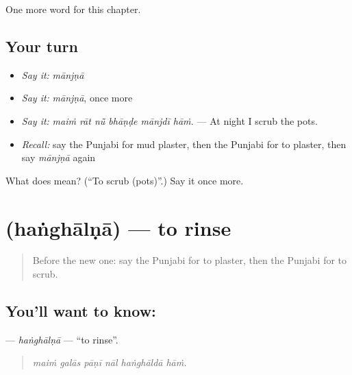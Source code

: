 \begin{grammarlens}[title={What you've built}]
One more word for this chapter.
\end{grammarlens}

\subsection*{Your turn}
\begin{itemize}
\raggedright
  \item \emph{Say it:} \emph{mānjṇā}
  \item \emph{Say it:} \emph{mānjṇā}, once more
  \item \emph{Say it:} \emph{maiṁ rāt nū̃ bhāṇḍe mānjdī hāṁ.} — At night I scrub the pots.
  \item \emph{Recall:} say the Punjabi for mud plaster, then the Punjabi for to plaster, then say \emph{mānjṇā} again
\end{itemize}

\begin{tcolorbox}[breakable,colback=teal!4,colframe=teal!35!black,title={Before you move on}]
What does  mean? (\textquotedblleft{}To scrub (pots)\textquotedblright{}.) Say it once more.
\end{tcolorbox}
\section[\texorpdfstring{\pa{ਹੰਘਾਲਣਾ} (haṅghālṇā)}{ਹੰਘਾਲਣਾ (haṅghālṇā)}]{ (haṅghālṇā) — to rinse}

\label{lesson:PA-C236-hanghalna}



\begin{quote}
Before the new one: say the Punjabi for to plaster, then the Punjabi for to scrub.
\end{quote}

\subsection*{You'll want to know: }
\textbf{} — \emph{haṅghālṇā} — \textquotedblleft{}to rinse\textquotedblright{}.

\begin{quote}
     
\end{quote}

\begin{quote}
\emph{maiṁ galās pāṇī nāl haṅghāldā hāṁ.}
\end{quote}

